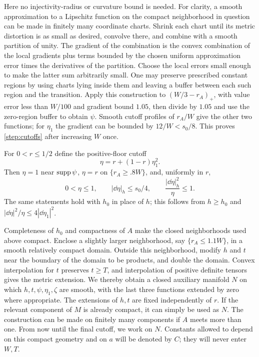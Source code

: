 Here no injectivity-radius or curvature bound is needed.  For clarity, a
smooth approximation to a Lipschitz function on the compact neighborhood
in question can be made in finitely many coordinate charts.  Shrink each
chart until its metric distortion is as small as desired, convolve there,
and combine with a smooth partition of unity.  The gradient of the
combination is the convex combination of the local gradients plus terms
bounded by the chosen uniform approximation error times the derivatives
of the partition.  Choose the local errors small enough to make the latter
sum arbitrarily small.  One may preserve prescribed constant regions by
using charts lying inside them and leaving a buffer between each such
region and the transition.  Apply this construction to
$(W/3-r_A)_+$, with value error less than $W/100$ and gradient bound
$1.05$, then divide by $1.05$ and use the zero-region buffer to obtain
$\psi$.  Smooth cutoff profiles of $r_A/W$ give the other two functions;
for $\eta_1$ the gradient can be bounded by $12/W<s_0/8$.  This proves
\cref{step:cutoffs} after increasing $W$ once.

For $0<r\le1/2$ define the positive-floor cutoff
\begin{equation}\label{step:floor}
 \eta=r+(1-r)\eta_1^2.
\end{equation}
Then $\eta=1$ near $\operatorname{supp}\psi$, $\eta=r$ on $\{r_A\ge.8W\}$,
and, uniformly in $r$,
\begin{equation}\label{step:floor-bounds}
 0<\eta\le1,\qquad |\dd\eta|_h\le s_0/4,
 \qquad \frac{|\dd\eta|_h^2}{\eta}\le1.
\end{equation}
The same statements hold with $h_0$ in place of $h$; this follows from
$h\ge h_0$ and $|\dd\eta|^2/\eta\le4|\dd\eta_1|^2$.

Completeness of $h_0$ and compactness of $A$ make the closed neighborhoods
used above compact.  Enclose a slightly larger neighborhood, say
$\{r_A\le1.1W\}$, in a smooth relatively compact domain.  Outside this
neighborhood, modify $h$ and $t$ near the boundary of the domain to be
products, and double the domain.  Convex interpolation for $t$ preserves
$t\ge T$, and interpolation of positive definite tensors gives the
metric extension.  We thereby obtain a closed auxiliary manifold $N$
on which $h,t,\psi,\eta_1,\zeta$ are smooth, with the last three functions
extended by zero where appropriate.  The extensions of $h,t$ are fixed
independently of $r$.  If the relevant component of $M$ is already compact,
it can simply be used as $N$.  The construction can be made on finitely
many components if $A$ meets more than one.  From now until the final
cutoff, we work on $N$.  Constants allowed to depend on this compact
geometry and on $a$ will be denoted by $C$; they will never enter $W,T$.

